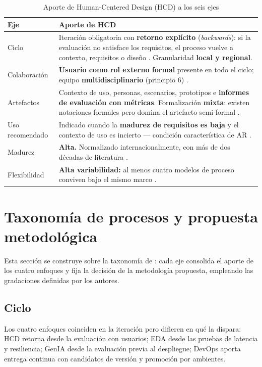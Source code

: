 \documentclass[conference]{IEEEtran}
\begin{document}
\begin{table}[!t]
\centering
\footnotesize
\caption{Aporte de Human-Centered Design (HCD) a los seis ejes}
\begin{tabular}{p{}p{}}
\hline
\textbf{Eje} & \textbf{Aporte de HCD} \\ \hline
Ciclo & Iteración obligatoria con \textbf{retorno explícito} (\textit{backwards}): si la evaluación no satisface los requisitos, el proceso vuelve a contexto, requisitos o diseño \cite{ISO9241210}. Granularidad \textbf{local y regional}. \\ \hline
Colaboración & \textbf{Usuario como rol externo formal} presente en todo el ciclo; equipo \textbf{multidisciplinario} (principio 6) \cite{ISO9241210}. \\ \hline
Artefactos & Contexto de uso, personas, escenarios, prototipos e \textbf{informes de evaluación con métricas}. Formalización \textbf{mixta}: existen notaciones formales pero domina el artefacto semi-formal \cite{Paterno2000,OMG-IFML}. \\ \hline
Uso recomendado & Indicado cuando la \textbf{madurez de requisitos es baja} y el contexto de uso es incierto — condición característica de AR \cite{Graser2024}. \\ \hline
Madurez & \textbf{Alta.} Normalizado internacionalmente, con más de dos décadas de literatura \cite{ISO9241210,Seffah2005}. \\ \hline
Flexibilidad & \textbf{Alta variabilidad:} al menos cuatro modelos de proceso conviven bajo el mismo marco \cite{Ferre2005}. \\ \hline
\end{tabular}
\end{table}

\section{Taxonomía de procesos y propuesta metodológica}

Esta sección se construye sobre la taxonomía de \cite{Ceret2013}: cada eje consolida el aporte de los cuatro enfoques y fija la decisión de la metodología propuesta, empleando las gradaciones definidas por los autores.

\subsection{Ciclo}

Los cuatro enfoques coinciden en la iteración pero difieren en qué la dispara: HCD retorna desde la evaluación con usuarios; EDA desde las pruebas de latencia y resiliencia; GenIA desde la evaluación previa al despliegue; DevOps aporta entrega continua con candidatos de versión y promoción por ambientes.
\end{document}
